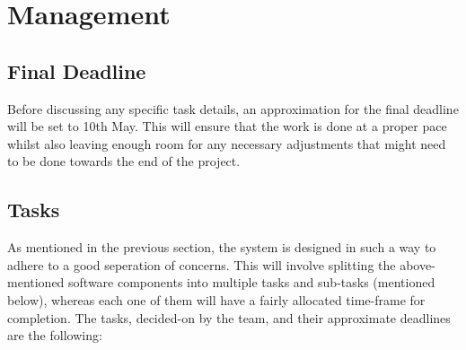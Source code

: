 \documentclass[11pt,a4paper
]{scrartcl}
\begin{document}
\section{Management}
\subsection{Final Deadline}
Before discussing any specific task details, an approximation for the final deadline will be set to 10th May. This will ensure that the work is done at a proper pace whilst also
leaving enough room for any necessary adjustments that might need to be done towards the end of the project.

\subsection{Tasks}
As mentioned in the previous section, the system is designed in such a way to adhere to a good seperation of concerns. This will involve splitting the above-mentioned software
components into multiple tasks and sub-tasks (mentioned below), whereas each one of them will have a fairly allocated time-frame for completion.
The tasks, decided-on by the team, and their approximate deadlines are the following:
\end{document}
